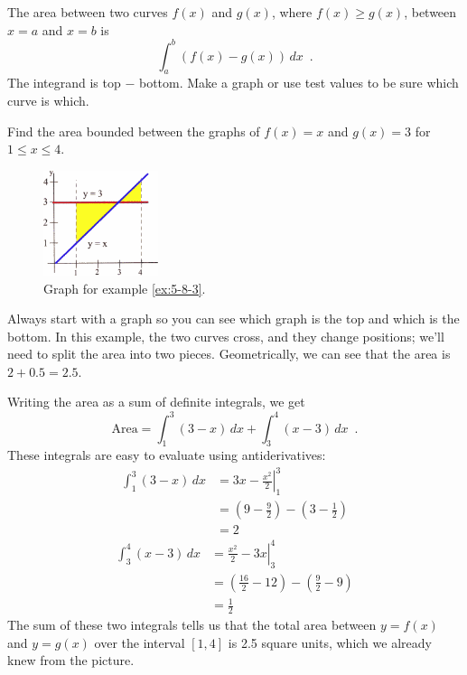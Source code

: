 \begin{theorem}
The area between two curves $f(x)$ and $g(x)$, where $f(x)\geq g(x)$, between $x=a$ and $x=b$ is
$$\int_a^b(f(x)-g(x))\,dx \enspace .$$
The integrand is top $-$ bottom. Make a graph or use test values to be sure which curve is which.
\end{theorem}
\begin{example}
\label{ex:5-8-3}
Find the area bounded between the graphs of $f(x)=x$ and $g(x)=3$ for $1\leq x\leq 4$.

\begin{figure}[!ht]
  \centering
    \includegraphics[width=0.3\textwidth]{img/chap5/image050.png}
    \caption{Graph for example \ref{ex:5-8-3}.}
    \label{fig:5-8-ex3}
\end{figure}

\begin{solution}
Always start with a graph so you can see which graph is the top and which is the bottom. In this example, the two curves cross, and they change positions; we'll need to split the area into two pieces. Geometrically, we can see that the area is $2 + 0.5 = 2.5$.

Writing the area as a sum of definite integrals, we get
$$\text{Area} = \int_1^3(3-x)\,dx + \int_3^4(x-3)\,dx \enspace .$$
These integrals are easy to evaluate using antiderivatives:
  \begin{align*}
    \int_1^3(3-x)\,dx &= \left.3x-\frac{x^2}{2}\right|_1^3 \\
    &= \left(9-\frac{9}{2}\right) - \left(3-\frac{1}{2}\right) \\
    &= 2
  \end{align*}
  \begin{align*}
    \int_3^4(x-3)\,dx &= \left.\frac{x^2}{2}-3x\right|_3^4 \\
    &= \left(\frac{16}{2}-12\right) - \left(\frac{9}{2}-9\right)\\
    &= \frac{1}{2}
  \end{align*}
The sum of these two integrals tells us that the total area between $y=f(x)$ and $y=g(x)$ over the interval $[1, 4]$ is 2.5 square units, which we already knew from the picture.
\end{solution}\end{example}

